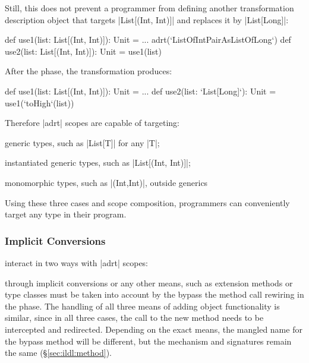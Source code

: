 Still, this does not prevent a programmer from defining another transformation description object that targets |List[(Int, Int)]| and replaces it by |List[Long]|:

\begin{lstlisting-nobreak}
def use1(list: List[(Int, Int)]): Unit = ...
adrt(`ListOfIntPairAsListOfLong`) {
  def use2(list: List[(Int, Int)]): Unit = use1(list)
}
\end{lstlisting-nobreak}

After the \commit{} phase, the transformation produces:

\begin{lstlisting-nobreak}
def use1(list: List[(Int, Int)]): Unit = ...
def use2(list: `List[Long]`): Unit = use1(`toHigh`(list))
\end{lstlisting-nobreak}

Therefore |adrt| scopes are capable of targeting:
\begin{compactitem}
\item generic types, such as |List[T]| for any |T|;
\item instantiated generic types, such as |List[(Int, Int)]|;
\item monomorphic types, such as |(Int,Int)|, outside generics
\end{compactitem}

\noindent
Using these three cases and scope composition, programmers can conveniently target any type in their program.

\subsubsection{Implicit Conversions}
\label{sec:ildl:language-implicit-conversions}
interact in two ways with |adrt| scopes:

 through implicit conversions or any other means, such as extension methods or type classes must be taken into account by the bypass the method call rewiring in the \coerce{} phase. The handling of all three means of adding object functionality is similar, since in all three cases, the call to the new method needs to be intercepted and redirected. Depending on the exact means, the mangled name for the bypass method will be different, but the mechanism and signatures remain the same (\S\ref{sec:ildl:method}).

